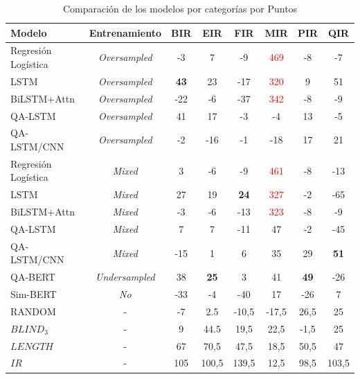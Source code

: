 \begin{table}[!ht]
  \begin{center}
    \caption{Comparación de los modelos por categorías por Puntos}
    \begin{tabular}{l|c|c|c|c|c|c|c}
      \textbf{Modelo} & \textbf{Entrenamiento} & \textbf{BIR} & \textbf{EIR} & \textbf{FIR} & \textbf{MIR} & \textbf{PIR} & \textbf{QIR}\\
      \hline
      Regresión Logística & \textit{Oversampled} & -3 & 7 & -9 & \textcolor{red}{469} & -8 & -7 \\
      LSTM & \textit{Oversampled} & \textbf{43} & 23 & -17 & \textcolor{red}{320} & 9 & 51\\
      BiLSTM+Attn & \textit{Oversampled} & -22 & -6 & -37 & \textcolor{red}{342} & -8 & -9\\
      QA-LSTM & \textit{Oversampled} & 41 & 17 & -3 & -4 & 13 & -5\\
      QA-LSTM/CNN & \textit{Oversampled} & -2 & -16 & -1 & -18 & 17 & 21\\

      Regresión Logística & \textit{Mixed} & 3 & -6 & -9 & \textcolor{red}{461} & -8 & -13\\
      LSTM & \textit{Mixed} & 27 & 19 & \textbf{24} & \textcolor{red}{327} & -2 & -65\\
      BiLSTM+Attn & \textit{Mixed} & -3 & -6 & -13 & \textcolor{red}{323} & -8 & -9 \\
      QA-LSTM & \textit{Mixed} & 7 & 7 & -11 & 47 & -2 & -45 \\
      QA-LSTM/CNN & \textit{Mixed} & -15 & 1 & 6 & 35 & 29 & \textbf{51} \\

      QA-BERT & \textit{Undersampled} & 38 & \textbf{25} & 3 & 41 & \textbf{49} & -26 \\
      Sim-BERT & \textit{No} & -33 & -4 & -40 & 17 & -26 & 7 \\
      \hline
      RANDOM & - & -7 & 2.5 & -10,5 & -17,5 & 26,5 & 25 \\
      $BLIND_3$ & - & 9 & 44.5 & 19,5 & 22,5 & -1,5 & 25 \\
      $LENGTH$ & - & 67 & 70,5 & 47,5 & 18,5 & 50,5 & 47 \\
      $IR$ & - & 105 & 100,5 & 139,5 & 12,5 & 98,5 & 103,5 \\
    \end{tabular}
  \end{center}
  \label{comparison_points}
\end{table}

